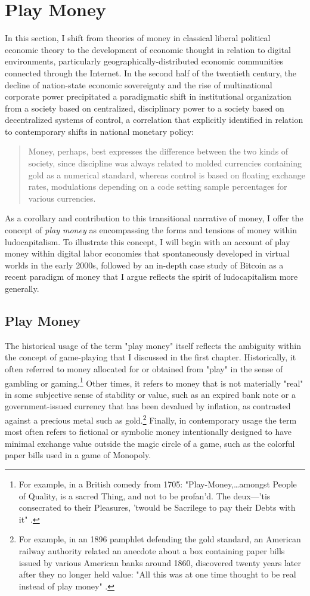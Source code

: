 \section{Play Money}
In this section, I shift from theories of money in classical liberal political economic theory to the development of economic thought in relation to digital environments, particularly geographically-distributed economic communities connected through the Internet. In the second half of the twentieth century, the decline of nation-state economic sovereignty and the rise of multinational corporate power precipitated a paradigmatic shift in institutional organization from a society based on centralized, disciplinary power to a society based on decentralized systems of control, a correlation that \citeauthor{Deleuze95} explicitly identified in relation to contemporary shifts in national monetary policy:
\blockcquote[180]{Deleuze95}{
  Money, perhaps, best expresses the difference between the two kinds of society, since discipline was always related to molded currencies containing gold as a numerical standard, whereas control is based on floating exchange rates, modulations depending on a code setting sample percentages for various currencies.
}
As a corollary and contribution to this transitional narrative of money, I offer the concept of \emph{play money} as encompassing the forms and tensions of money within ludocapitalism. To illustrate this concept, I will begin with an account of play money within digital labor economies that spontaneously developed in virtual worlds in the early 2000s, followed by an in-depth case study of Bitcoin as a recent paradigm of money that I argue reflects the spirit of ludocapitalism more generally.

\subsection*{Play Money}
The historical usage of the term "play money" itself reflects the ambiguity within the concept of game-playing that I discussed in the first chapter. Historically, it often referred to money allocated for or obtained from "play" in the sense of gambling or gaming.\footnote{
  For example, in a British comedy from 1705: "Play-Money,…amongst People of Quality, is a sacred Thing, and not to be profan'd. The deux---'tis consecrated to their Pleasures, 'twould be Sacrilege to pay their Debts with it" \autocite{VanbrughConfed}.
}
Other times, it refers to money that is not materially "real" in some subjective sense of stability or value, such as an expired bank note or a government-issued currency that has been devalued by inflation, as contrasted against a precious metal such as gold.\footnote{
  For example, in an 1896 pamphlet defending the gold standard, an American railway authority related an anecdote about a box containing paper bills issued by various American banks around 1860, discovered twenty years later after they no longer held value: "All this was at one time thought to be real instead of play money" \autocite[9]{Kirkman1896}.
}
Finally, in contemporary usage the term most often refers to fictional or symbolic money intentionally designed to have minimal exchange value outside the magic circle of a game, such as the colorful paper bills used in a game of Monopoly.

